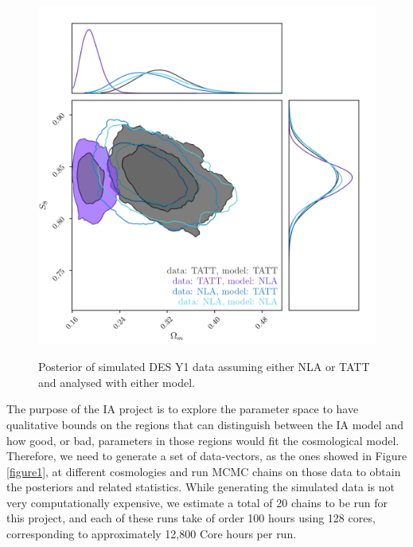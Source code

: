\documentclass[12pt]{article}
\begin{document}
\begin{small}

\begin{figure}[!h]
\begin{center}
\includegraphics[height=12cm]{1x2pt_TATT_NLA_mn_all.png}
\end{center}
 \caption{Posterior of simulated DES Y1 data assuming either NLA or TATT and analysed with either model.}
\label{figure2}
\end{figure}

The purpose of the IA project is to explore the parameter space to have qualitative bounds on the regions that can distinguish between the IA model and how good, or bad, parameters in those regions would fit the cosmological model. Therefore, we need to generate a set of data-vectors, as the ones showed in Figure \ref{figure1}, at different cosmologies and run MCMC chains on those data to obtain the posteriors and related statistics. While generating the simulated data is not very computationally expensive, we estimate a total of 20 chains to be run for this project, and each of these runs take of order 100 hours using 128 cores, corresponding to approximately 12,800 Core hours per run.



\end{small}
\end{document}
